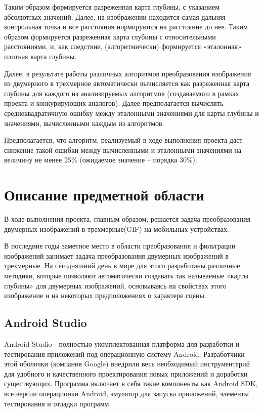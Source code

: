 Таким образом формируется разреженная карта глубины, с указанием абсолютных значений. Далее, на изображении находится самая дальняя контрольная точка и все расстояния нормируются на расстояние до нее. Таким образом формируется разреженная карта глубины с относительными расстояниями, и, как следствие, (алгоритмически) формируется «эталонная» плотная карта глубины.

Далее, в результате работы различных алгоритмов преобразования изображения из двумерного в трехмерное автоматически вычисляется как разреженная карта глубины для каждого из анализируемых алгоритмов (создаваемого в рамках проекта и конкурирующих аналогов). Далее предполагается вычислять среднеквадратичную ошибку между эталонными значениями для карты глубины и значениями, вычисленными каждым из алгоритмов.

Предполагается, что алгоритм, реализуемый в ходе выполнения проекта даст снижение такой ошибки между вычисленными и эталонными значениями на величину не менее 25\% (ожидаемое значение – порядка 30\%).

\section{Описание предметной области}
В ходе выполнения проекта, главным образом, решается задача преобразования двумерных изображений в трехмерные(GIF) на мобильных устройствах.

В последние годы заметное место в области преобразования и фильтрации изображений занимает задача преобразования двумерных изображений в трехмерные. На сегодняшний день в мире для этого разработаны различные методики, которые позволяют автоматически создавать так называемые «карты глубины» для двумерных изображений, основываясь на свойствах этого изображение и на некоторых предположениях о характере сцены. 

\subsection{Android Studio}
Android Studio - полностью укомплектованная платформа для разработки и тестирования приложений под операционную систему Android. Разработчики этой оболочки (компания Google) внедрили весь необходимый инструментарий для удобного и качественного проектирования новых приложений и доработки существующих. Программа включает в себя такие компоненты как Android SDK, все версии операционки Android, эмулятор для запуска приложений, элементы тестирования и отладки программ.

